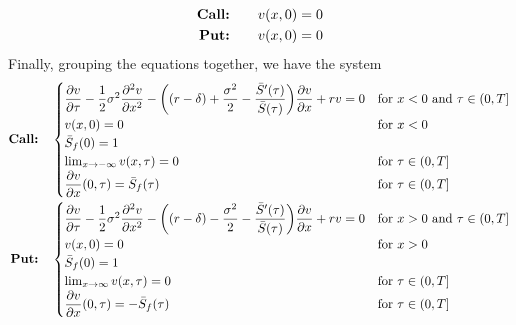 \begin{subequations} \label{eq:blackscholes:frontfixingmethod:logtransform:american_options_terminal_condition}
  \begin{align}
    \text{\textbf{Call:}} \qquad & v(x, 0) = 0 \\
    \text{\textbf{Put:}} \qquad & v(x, 0) = 0
  \end{align}
\end{subequations}
Finally, grouping the equations together, we have the system
\begin{subequations} \label{eq:blackscholes:frontfixingmethod:logtransform:american_options_bs_pde}
  \begin{align}
    \text{\textbf{Call:}} \quad &
    \begin{cases}
      \dfrac{\partial v}{\partial \tau} - \dfrac{1}{2}\sigma^2\dfrac{\partial^2 v}{\partial x^2} - \bigg((r-\delta) + \dfrac{\sigma^2}{2} - \dfrac{\bar{S}'(\tau)}{\bar{S}(\tau)} \bigg)\dfrac{\partial v}{\partial x} + rv = 0 & \text{for $x < 0$ and $\tau \in (0, T]$}  \\ 
      v(x, 0) = 0 & \text{for $x < 0$} \\ 
      \bar{S}_f(0) = 1  \\ 
      \lim_{x\rightarrow-\infty}{v(x, \tau)} = 0 & \text{for $\tau \in (0, T]$}  \\ 
      \dfrac{\partial{v}}{\partial{x}}(0, \tau) = \bar{S}_f(\tau) & \text{for $\tau \in (0, T]$} 
    \end{cases} \\
    \text{\textbf{Put:}} \quad &
    \begin{cases}
      \dfrac{\partial v}{\partial \tau} - \dfrac{1}{2}\sigma^2\dfrac{\partial^2 v}{\partial x^2} - \bigg((r-\delta) - \dfrac{\sigma^2}{2} - \dfrac{\bar{S}'(\tau)}{\bar{S}(\tau)} \bigg)\dfrac{\partial v}{\partial x} + rv = 0 & \text{for $x > 0$ and $\tau \in (0, T]$} \\ 
      v(x, 0) = 0 & \text{for $x > 0$}\\
      \bar{S}_f(0) = 1 \\ 
      \lim_{x\rightarrow\infty} v(x, \tau) = 0 & \text{for $\tau \in (0, T]$} \\ 
      \dfrac{\partial{v}}{\partial{x}}(0, \tau) = -\bar{S}_f(\tau) & \text{for $\tau \in (0, T]$}
    \end{cases}
  \end{align}
\end{subequations}